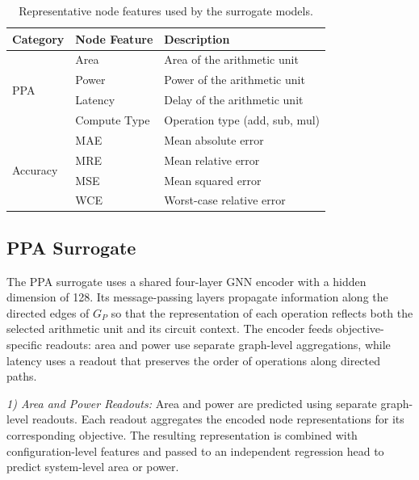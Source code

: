 \begin{table}[t]
\centering
\caption{Representative node features used by the surrogate models.}
\label{tab:node_features}
\footnotesize
\setlength{\tabcolsep}{3pt}
\renewcommand{\arraystretch}{1.12}
\begin{tabular}{p{}p{}p{}}
\toprule
\textbf{Category} & \textbf{Node Feature} & \textbf{Description} \\
\midrule
\multirow{4}{*}{PPA}
& Area & Area of the arithmetic unit \\
& Power & Power of the arithmetic unit \\
& Latency & Delay of the arithmetic unit \\
& Compute Type & Operation type (add, sub, mul) \\
\midrule
\multirow{4}{*}{Accuracy}
& MAE & Mean absolute error \\
& MRE & Mean relative error \\
& MSE & Mean squared error \\
& WCE & Worst-case relative error \\
\bottomrule
\end{tabular}
\end{table}

\subsection{PPA Surrogate}
\label{subsec:Area and power}

The PPA surrogate uses a shared four-layer GNN encoder with a hidden dimension of 128. Its message-passing layers propagate information along the directed edges of $G_P$ so that the representation of each operation reflects both the selected arithmetic unit and its circuit context. The encoder feeds objective-specific readouts: area and power use separate graph-level aggregations, while latency uses a readout that preserves the order of operations along directed paths.

\noindent\textit{1) Area and Power Readouts:}
Area and power are predicted using separate graph-level readouts. Each readout aggregates the encoded node representations for its corresponding objective. The resulting representation is combined with configuration-level features and passed to an independent regression head to predict system-level area or power.

